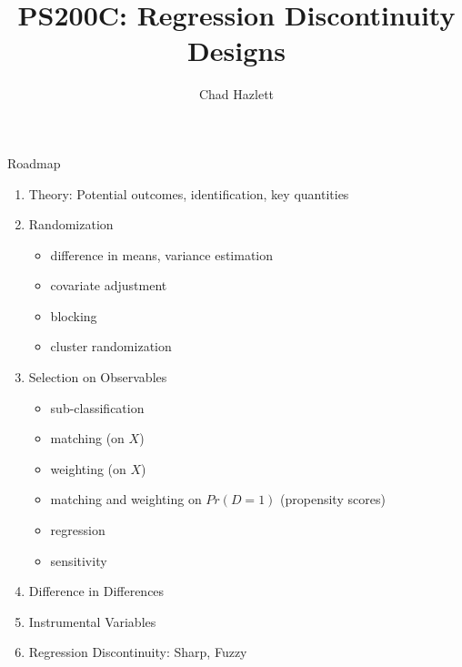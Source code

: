 \documentclass[xcolor=dvipsnames]{beamer}
\title{PS200C: Regression Discontinuity Designs}
\author{Chad Hazlett}
\institute[UCLA]{UCLA\\[1ex]
  \texttt{chazlett@ucla.edu}}
\begin{document}
%

\begin{frame}
  \titlepage
\end{frame}

\begin{frame}{Roadmap}
\begin{enumerate}
\item Theory: Potential outcomes, identification, key quantities
\item Randomization
\begin{itemize}
\item difference in means, variance estimation
\item covariate adjustment
\item blocking
\item cluster randomization
\end{itemize}
\item Selection on Observables
\begin{itemize}
\item sub-classification
\item matching (on $X$)
\item weighting (on $X$)
\item matching and weighting on $Pr(D=1)$ (propensity scores)
\item regression 
\item sensitivity
\end{itemize}
\item Difference in Differences 
\item Instrumental Variables
\item Regression Discontinuity: Sharp, Fuzzy
\end{enumerate}
\end{frame}
\end{document}

